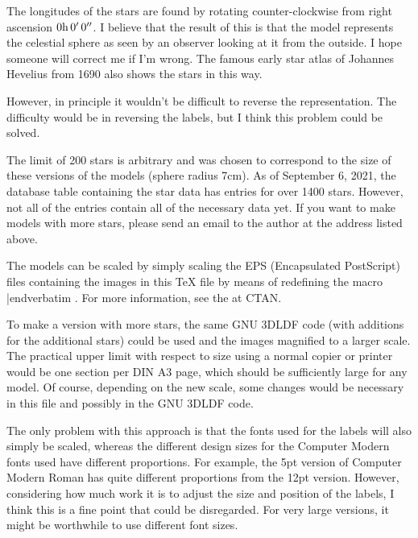 The longitudes of the stars are found by rotating counter-clockwise
from right ascension $0\rm{h}\thinspace 0^\prime\thinspace 0^{\prime\prime}$.
I believe that the result of this is that the model represents the celestial sphere
as seen by an observer looking at it from the outside. I hope someone will correct me
if I'm wrong. The famous early star atlas of Johannes Hevelius from 1690 also shows the stars
in this way.

However, in principle it wouldn't be difficult to reverse the representation. The difficulty would be
in reversing the labels, but I think this problem could be solved.

The limit of 200 stars is arbitrary and was chosen to correspond to the size of these versions of
the models (sphere radius 7cm).  As of September 6, 2021, the database table containing the star data has
entries for over 1400 stars.  However, not all of the entries contain all of the necessary data yet.
If you want to make models with more stars, please send an email to the author at the address listed above.

The models can be scaled by simply scaling the EPS (Encapsulated PostScript)
files containing the images in this {\TeX} file by means of redefining the macro
\verbatim \epsfsize|endverbatim .  For more information, see the
\href{https://ftp.rrzn.uni-hannover.de/pub/mirror/tex-archive/macros/generic/epsf/epsf-doc.pdf}{}
at CTAN.

To make a version with more stars, the same GNU 3DLDF code (with additions for the additional stars)
could be used and the images magnified to a larger scale.
The practical upper limit with respect to size using a normal copier or printer would be one section
per DIN A3 page, which should be sufficiently large for any model.  Of course, depending on the new scale,
some changes would be necessary in this file and possibly in the GNU 3DLDF code.

The only problem with this approach is that the fonts used for the
labels will also simply be scaled, whereas the different design sizes
for the Computer Modern fonts used have different proportions. For example,
the 5pt version of Computer Modern Roman has quite different proportions from the 12pt version.
However, considering how much work it is to adjust the size and position of the labels, I think this
is a fine point that could be disregarded. For very large versions, it might be worthwhile to use
different font sizes.
\baselineskip
\endgroup

